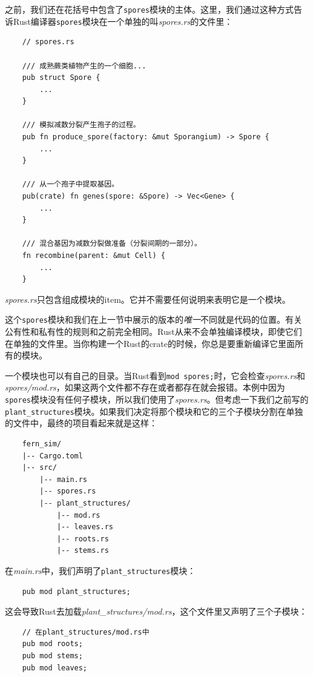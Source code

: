 之前，我们还在花括号中包含了\texttt{spores}模块的主体。这里，我们通过这种方式告诉Rust编译器\texttt{spores}模块在一个单独的叫\emph{spores.rs}的文件里：
\begin{verbatim}
    // spores.rs

    /// 成熟蕨类植物产生的一个细胞...
    pub struct Spore {
        ...
    }

    /// 模拟减数分裂产生孢子的过程。
    pub fn produce_spore(factory: &mut Sporangium) -> Spore {
        ...
    }

    /// 从一个孢子中提取基因。
    pub(crate) fn genes(spore: &Spore) -> Vec<Gene> {
        ...
    }

    /// 混合基因为减数分裂做准备（分裂间期的一部分）。
    fn recombine(parent: &mut Cell) {
        ...
    }
\end{verbatim}

\emph{spores.rs}只包含组成模块的item。它并不需要任何说明来表明它是一个模块。

这个\texttt{spores}模块和我们在上一节中展示的版本的\emph{唯一}不同就是代码的位置。有关公有性和私有性的规则和之前完全相同。Rust从来不会单独编译模块，即使它们在单独的文件里。当你构建一个Rust的crate的时候，你总是要重新编译它里面所有的模块。

一个模块也可以有自己的目录。当Rust看到\texttt{mod spores;}时，它会检查\emph{spores.rs}和\\
\emph{spores/mod.rs}，如果这两个文件都不存在或者都存在就会报错。本例中因为\texttt{spores}模块没有任何子模块，所以我们使用了\emph{spores.rs}。但考虑一下我们之前写的\texttt{plant\_structures}模块。如果我们决定将那个模块和它的三个子模块分割在单独的文件中，最终的项目看起来就是这样：
\begin{verbatim}
    fern_sim/
    |-- Cargo.toml
    |-- src/
        |-- main.rs
        |-- spores.rs
        |-- plant_structures/
            |-- mod.rs
            |-- leaves.rs
            |-- roots.rs
            |-- stems.rs
\end{verbatim}

在\emph{main.rs}中，我们声明了\texttt{plant\_structures}模块：
\begin{verbatim}
    pub mod plant_structures;
\end{verbatim}

这会导致Rust去加载\emph{plant\_structures/mod.rs}，这个文件里又声明了三个子模块：
\begin{verbatim}
    // 在plant_structures/mod.rs中
    pub mod roots;
    pub mod stems;
    pub mod leaves;
\end{verbatim}

